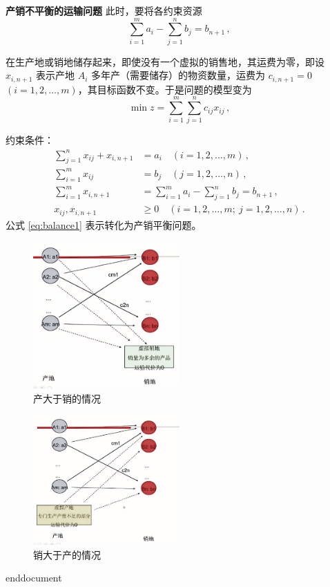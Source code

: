 \begin{exbox}{\textbf{产销不平衡的运输问题}}
    此时，要将各约束资源
    \begin{equation}
        \sum_{i=1}^{m} a_i - \sum_{j=1}^{n} b_j = b_{n+1} \,,
    \end{equation}
    
    在生产地或销地储存起来，即使没有一个虚拟的销售地，其运费为零，即设 $x_{i,n+1}$ 表示产地 $A_i$ 多年产（需要储存）的物资数量，运费为 $c_{i,n+1}=0$ $(i=1,2,\dots,m)$，其目标函数不变。于是问题的模型变为
    \begin{equation}
        \min z = \sum_{i=1}^{m} \sum_{j=1}^{n} c_{ij} x_{ij} \,,
    \end{equation}
    
    约束条件：
    \begin{align}
        \sum_{j=1}^{n} x_{ij} + x_{i,n+1} &= a_i \quad (i=1,2,\dots,m) \,, \label{eq:balance1} \\
        \sum_{i=1}^{m} x_{ij} &= b_j \quad (j=1,2,\dots,n) \,, \label{eq:balance2} \\
        \sum_{i=1}^{m} x_{i,n+1} &= \sum_{i=1}^{m} a_i - \sum_{j=1}^{n} b_j = b_{n+1} \,, \label{eq:balance3} \\
        x_{ij}, x_{i,n+1} &\geq 0 \quad (i=1,2,\dots,m;\ j=1,2,\dots,n) \,. \label{eq:nonneg}
    \end{align}
    公式 \eqref{eq:balance1} 表示转化为产销平衡问题。
\end{exbox}
\begin{figure}[H]
    \centering
    \includegraphics[width=0.5\textwidth]{6.png}
    \caption{产大于销的情况}
    \label{fig:Temporary Pavilion}
\end{figure}

\begin{figure}[H]
    \centering
    \includegraphics[width=0.5\textwidth]{7.png}
    \caption{销大于产的情况}
    \label{fig:Temporary Pavilion}
\end{figure}

\ifx\allfiles\undefined
	
	
	
	end{document}
	\else
	\fi
